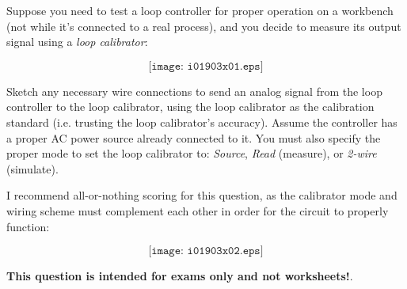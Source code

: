 

Suppose you need to test a loop controller for proper operation on a workbench (not while it's connected to a real process), and you decide to measure its output signal using a {\it loop calibrator}:

$$\texttt{[image: i01903x01.eps]}$$

Sketch any necessary wire connections to send an analog signal from the loop controller to the loop calibrator, using the loop calibrator as the calibration standard (i.e. trusting the loop calibrator's accuracy).  Assume the controller has a proper AC power source already connected to it.  You must also specify the proper mode to set the loop calibrator to: {\it Source}, {\it Read} (measure), or {\it 2-wire} (simulate).







I recommend all-or-nothing scoring for this question, as the calibrator mode and wiring scheme must complement each other in order for the circuit to properly function:

$$\texttt{[image: i01903x02.eps]}$$







{\bf This question is intended for exams only and not worksheets!}.


